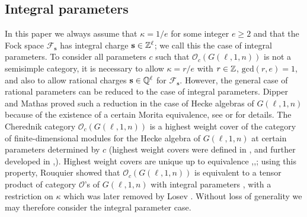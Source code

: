 \documentclass[12pt]{amsart}
\numberwithin{equation}{section}
\theoremstyle{definition}
\newcommand{\oh}{\mathcal{O}}
\newcommand{\mbs}{\mathbf{s}}
\begin{document}
\subsection{Integral parameters}\label{integralpar}
In this paper we always assume that $\kappa=1/e$ for some integer $e\geq 2$ and that the Fock space $\mathcal{F}_\mbs$ has integral charge $\mbs\in\Z^\ell$; we call this the case of integral parameters. 
To consider all parameters $c$ such that $\oh_c(G(\ell,1,n))$ is not a semisimple category, it is necessary to allow $\kappa=r/e$ with $r\in\mathbb{Z}$, $\mathrm{gcd}(r,e)=1$, and also to allow rational charges $\mbs\in\Q^\ell$ for $\mathcal{F}_\mbs$. 
However, the general case of rational parameters can be reduced to the case of integral parameters.
Dipper and Mathas proved such a reduction in the case of Hecke algebras of $G(\ell,1,n)$ because of the existence of a certain Morita equivalence, see \cite[Theorem 1.1]{DipperMathas} or \cite[Section 5.4]{GeckJacon2011} for details.
The Cherednik category $\oh_c(G(\ell,1,n))$ is a highest weight cover of the category of finite-dimensional modules
for the Hecke algebra of $G(\ell,1,n)$ at certain parameters determined by $c$ \cite{Rouquier} (highest weight covers were defined in \cite{Rouquier}, and further developed in \cite{RSVV},\cite{Losev}). 
Highest weight covers are unique up to equivalence \cite{Rouquier},\cite{RSVV},\cite{Losev}; using this property, Rouquier showed that $\oh_c(G(\ell,1,n))$ is equivalent to a tensor product of category $\oh$'s of $G(\ell,1,n)$ with integral parameters \cite[Theorem 6.13, Remark 6.16]{Rouquier}, with a restriction on $\kappa$ which was later removed by Losev \cite[Proposition 3.2]{Losev2015a}. Without loss of generality we may therefore consider the integral parameter case.
\end{document}
